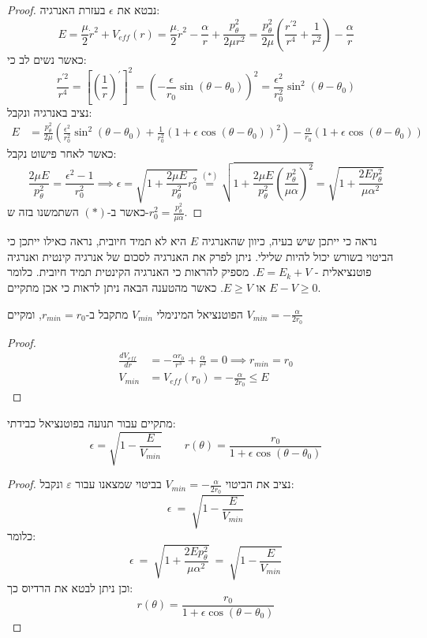 \documentclass{tstextbook}
\begin{document}
\begin{proof}
נבטא את \(\epsilon\) בעזרת האנרגיה:
$$ E=\frac\mu2\dot{r}^2+V_{eff}(r)=\frac\mu2\dot{r}^2-\frac\alpha r+\frac{p_\theta^2}{2\mu r^2} =\frac{p_\theta^2}{2\mu}\left(\frac{r^{\prime2}}{r^4}+\frac1{r^2}\right)-\frac\alpha r$$
כאשר נשים לב כי:
$$ \frac{r^{\prime2}}{r^4}=\left[\left(\frac1r\right)^{\prime}\right]^2=\left(  -\frac\epsilon{r_0}\sin\left( \theta-\theta_0 \right) \right)^2=\frac{\epsilon^2}{r_{0}^2}\sin^2\left( \theta-\theta_{0} \right)$$
נציב באנרגיה ונקבל:
$$ \begin{aligned}E&=\frac{p_\theta^2}{2\mu}\left(\frac{\epsilon^2}{r_0^2}\sin^2(\theta-\theta_0)+\frac{1}{r_0^2}\left(1+\epsilon\cos(\theta-\theta_0)\right)^2\right)-\frac{\alpha}{r_0}\left(1+\epsilon\cos(\theta-\theta_0)\right)\end{aligned}$$
כאשר לאחר פישוט נקבל:
$$ \frac{2\mu E}{p_\theta^2}=\frac{\epsilon^2-1}{r_0^2}\implies  \epsilon=\sqrt{1+\frac{2\mu E}{p_\theta^2}r_0^2}\overset{(*)}{\operatorname*{=}}\sqrt{1+\frac{2\mu E}{p_\theta^2}\left(\frac{p_\theta^2}{\mu\alpha}\right)^2}=\sqrt{1+\frac{2Ep_\theta^2}{\mu\alpha^2}}$$
כאשר ב-\((*)\) השתמשנו בזה ש-\(r_{0}^2=\frac{p_{\theta}^2}{\mu \alpha}\).

\end{proof}
\begin{remark}
נראה כי ייתכן שיש בעיה, כיוון שהאנרגיה \(E\) היא לא תמיד חיובית, נראה כאילו ייתכן כי הביטוי בשורש יכול להיות שלילי. ניתן לפרק את האנרגיה לסכום של אנרגיה קינטית ואנרגיה פוטנציאלית - \(E=E_{k}+V\). מספיק להראות כי האנרגיה הקינטית תמיד חיובית. כלומר \(E-V\geq 0\) או \(E\geq V\). כאשר מהטענה הבאה ניתן לראות כי אכן מתקיים.

\end{remark}
\begin{proposition}
הפוטנציאל המינימלי \(V_{min}\) מתקבל ב-\(r_{min}=r_{0}\), ומקיים \(V_{min}=-\frac{\alpha}{2r_{0}}\)

\end{proposition}
\begin{proof}
$$ \begin{aligned}\frac{dV_{eff}}{dr}&=-\frac{\alpha r_0}{r^3}+\frac\alpha{r^2}=0\implies r_{min}=r_0\\V_{min}&=V_{eff}\left(r_0\right)=-\frac\alpha{2r_0}\leq E\end{aligned}$$

\end{proof}
\begin{proposition}
מתקיים עבור תנועה בפוטנציאל כבידתי:
$$\epsilon=\sqrt{1-\frac E{V_{min}}} \qquad r\left(\theta\right)=\frac{r_0}{1+\epsilon\cos\left(\theta-\theta_0\right)}$$

\end{proposition}
\begin{proof}
נציב את הביטוי \(V_{min}=-\frac{\alpha}{2r_{0}}\) בביטוי שמצאנו עבור \(\varepsilon\) ונקבל:
$$ \epsilon\:=\:\sqrt{1-\frac E{V_{min}}}
$$
כלומר:
$$\boxed{ \epsilon\:=\:\sqrt{ 1+\frac{2Ep_{\theta}^2 }{\mu \alpha^2}}\:=\:\sqrt{1-\frac E{V_{min}}}}
$$
וכן ניתן לבטא את הרדיוס כך:
$$\boxed{ r\left(\theta\right)=\frac{r_0}{1+\epsilon\cos\left(\theta-\theta_0\right)}}
$$

\end{proof}
\end{document}
